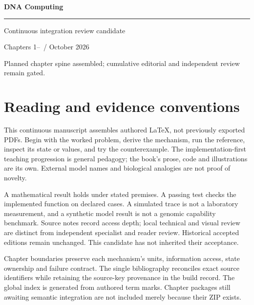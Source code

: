 \documentclass[11pt,oneside,openany]{book}
\begin{document}
\frontmatter
{}
\begin{titlepage}
\color{Blue}\sffamily\vspace*{24mm}
{\Huge\bfseries DNA Computing\par}
\vspace{12mm}{\Large Molecular mechanisms, algorithms and evidence\par}
\vspace{14mm}\rule{\linewidth}{.8pt}\par
\vspace{7mm}{\large Define the mechanism. Derive the result. Test the claim.\par}
\vfill Continuous integration review candidate\par
Chapters 1--\IncludedThrough\ / October 2026\par
Planned chapter spine assembled; cumulative editorial and independent review remain gated.
\end{titlepage}
\chapter*{Reading and evidence conventions}
This continuous manuscript assembles authored LaTeX, not previously exported PDFs.
Begin with the worked problem, derive the mechanism, run the reference, inspect
its state or values, and try the counterexample. The implementation-first
teaching progression is general pedagogy; the book's prose, code and illustrations
are its own. External model names and biological analogies are not proof of novelty.

A mathematical result holds under stated premises. A passing test checks the
implemented function on declared cases. A simulated trace is not a laboratory
measurement, and a synthetic model result is not a genomic capability benchmark.
Source notes record access depth; local technical and visual review are distinct
from independent specialist and reader review. Historical accepted editions
remain unchanged. This candidate has not inherited their acceptance.

Chapter boundaries preserve each mechanism's units, information access, state
ownership and failure contract. The single bibliography reconciles exact source
identifiers while retaining the source-key provenance in the build record.
The global index is generated from authored term marks. Chapter packages still
awaiting semantic integration are not included merely because their ZIP exists.

\clearpage
\tableofcontents
\mainmatter
{}

\backmatter
{}


\clearpage{}
\printindex
\end{document}

